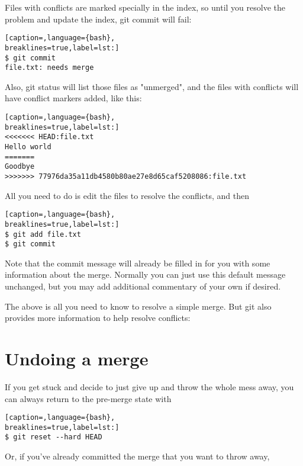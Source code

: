 Files with conflicts are marked specially in the index, so until you resolve
the problem and update the index, git commit will fail:

\lstset{basicstyle=\scriptsize, numbers=none, captionpos=b, tabsize=4}
\begin{lstlisting}[caption=,language={bash},
breaklines=true,label=lst:]
$ git commit
file.txt: needs merge
\end{lstlisting}

Also, git status will list those files as "unmerged", and the files with
conflicts will have conflict markers added, like this:

\lstset{basicstyle=\scriptsize, numbers=none, captionpos=b, tabsize=4}
\begin{lstlisting}[caption=,language={bash},
breaklines=true,label=lst:]
<<<<<<< HEAD:file.txt
Hello world
=======
Goodbye
>>>>>>> 77976da35a11db4580b80ae27e8d65caf5208086:file.txt
\end{lstlisting}

All you need to do is edit the files to resolve the conflicts, and then

\lstset{basicstyle=\scriptsize, numbers=none, captionpos=b, tabsize=4}
\begin{lstlisting}[caption=,language={bash},
breaklines=true,label=lst:]
$ git add file.txt
$ git commit
\end{lstlisting}

Note that the commit message will already be filled in for you with some
information about the merge. Normally you can just use this default message
unchanged, but you may add additional commentary of your own if desired.

The above is all you need to know to resolve a simple merge. But git also
provides more information to help resolve conflicts:

\section{Undoing a merge}
If you get stuck and decide to just give up and throw the whole mess away, you
can always return to the pre-merge state with

\lstset{basicstyle=\scriptsize, numbers=none, captionpos=b, tabsize=4}
\begin{lstlisting}[caption=,language={bash},
breaklines=true,label=lst:]
$ git reset --hard HEAD
\end{lstlisting}

Or, if you've already committed the merge that you want to throw away,

